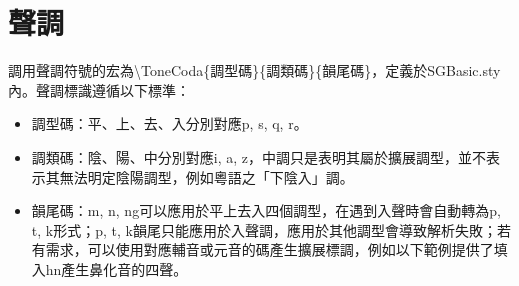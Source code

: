 \section{聲調}
調用聲調符號的宏為{\textbackslash}ToneCoda\{調型碼\}\{調類碼\}\{韻尾碼\}，定義於SGBasic.sty內。聲調標識遵循以下標準：\par
\begin{itemize}
	\item 調型碼：平、上、去、入分別對應p, s, q, r。
	\item 調類碼：陰、陽、中分別對應i, a, z，中調只是表明其屬於擴展調型，並不表示其無法明定陰陽調型，例如粵語之「下陰入」調。
	\item 韻尾碼：m, n, ng可以應用於平上去入四個調型，在遇到入聲時會自動轉為p, t, k形式；p, t, k韻尾只能應用於入聲調，應用於其他調型會導致解析失敗；若有需求，可以使用對應輔音或元音的碼產生擴展標調，例如以下範例提供了填入hn產生鼻化音的四聲。
\end{itemize}
\clearpage
